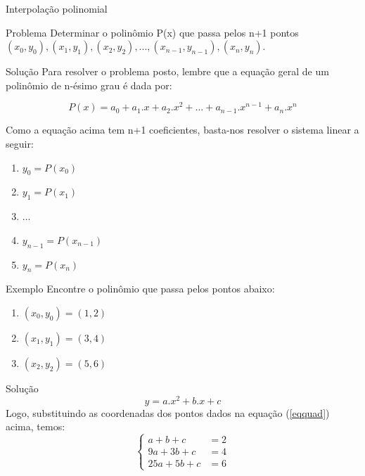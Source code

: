 \documentclass{beamer}
\begin{document}
	\begin{frame}{Interpolação polinomial}
		\begin{block}{Problema}
			Determinar o polinômio P(x) que passa pelos n+1 pontos $(x_0,y_0), (x_1,y_1), (x_2,y_2), ..., (x_{n-1},y_{n-1}), (x_n,y_n)$.
		\end{block}
	\end{frame}
	
	\begin{frame}{Solução}
		Para resolver o problema posto, lembre que a equação geral de um polinômio de n-ésimo grau é dada por:
		
		\begin{equation*}
		P(x)=a_0 + a_1 . x + a_2 . x^2 + ... + a_{n-1} . x^{n-1} + a_n . x^n
		\end{equation*}
		
		Como a equação acima tem  n+1 coeficientes, basta-nos  resolver o sistema linear a seguir:
		
		\begin{enumerate}
			\item $y_0 = P(x_0)$
			\item $y_1 = P(x_1)$
			\item ...
			\item $y_{n-1} = P(x_{n-1})$
			\item $y_n = P(x_n)$
		\end{enumerate}
	\end{frame}
	
	\begin{frame}{Exemplo}
		Encontre o polinômio que passa pelos pontos abaixo:
		\begin{enumerate}
			\item $(x_0,y_0)=(1,2)$
			\item $(x_1,y_1)=(3,4)$
			\item $(x_2,y_2)=(5,6)$
		\end{enumerate}
	\end{frame}
	
	
	
	
	\begin{frame}{Solução}
		\begin{equation}\label{eqquad}
		y=a.x^2+b.x+c
		\end{equation}
		Logo, substituindo as coordenadas dos pontos dados na equação (\ref{eqquad}) acima, temos:
		\begin{displaymath}\left\{
		\begin{array}{lr}
		a+b+c & = 2 \\
		9a+3b+c & = 4 \\
		25a+5b+c & = 6
		\end{array}
		\right.
		\end{displaymath}
	\end{frame}
	
\end{document}
